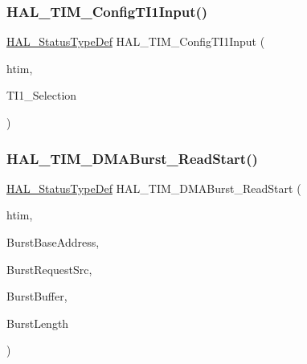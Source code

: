 \subsubsection{\texorpdfstring{H\+A\+L\+\_\+\+T\+I\+M\+\_\+\+Config\+T\+I1\+Input()}{HAL\_TIM\_ConfigTI1Input()}}
{\footnotesize\ttfamily \hyperlink{stm32f4xx__hal__def_8h_a63c0679d1cb8b8c684fbb0632743478f}{H\+A\+L\+\_\+\+Status\+Type\+Def} H\+A\+L\+\_\+\+T\+I\+M\+\_\+\+Config\+T\+I1\+Input (\begin{DoxyParamCaption}\item[{\hyperlink{struct_t_i_m___handle_type_def}{T\+I\+M\+\_\+\+Handle\+Type\+Def} $\ast$}]{htim,  }\item[{uint32\+\_\+t}]{T\+I1\+\_\+\+Selection }\end{DoxyParamCaption})}

\mbox{\label{group___t_i_m___exported___functions___group8_ga39c612c473747448615e2e3cb2668224}} 
\subsubsection{\texorpdfstring{H\+A\+L\+\_\+\+T\+I\+M\+\_\+\+D\+M\+A\+Burst\+\_\+\+Read\+Start()}{HAL\_TIM\_DMABurst\_ReadStart()}}
{\footnotesize\ttfamily \hyperlink{stm32f4xx__hal__def_8h_a63c0679d1cb8b8c684fbb0632743478f}{H\+A\+L\+\_\+\+Status\+Type\+Def} H\+A\+L\+\_\+\+T\+I\+M\+\_\+\+D\+M\+A\+Burst\+\_\+\+Read\+Start (\begin{DoxyParamCaption}\item[{\hyperlink{struct_t_i_m___handle_type_def}{T\+I\+M\+\_\+\+Handle\+Type\+Def} $\ast$}]{htim,  }\item[{uint32\+\_\+t}]{Burst\+Base\+Address,  }\item[{uint32\+\_\+t}]{Burst\+Request\+Src,  }\item[{uint32\+\_\+t $\ast$}]{Burst\+Buffer,  }\item[{uint32\+\_\+t}]{Burst\+Length }\end{DoxyParamCaption})}

